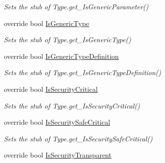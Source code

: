 \begin{DoxyCompactItemize}
\begin{DoxyCompactList}\small\item\em Sets the stub of Type.\-get\-\_\-\-Is\-Generic\-Parameter()\end{DoxyCompactList}\item 
override bool \hyperlink{class_system_1_1_reflection_1_1_fakes_1_1_stub_type_delegator_a31d4c9f0da2b370cdfa68913ef698212}{Is\-Generic\-Type}
\begin{DoxyCompactList}\small\item\em Sets the stub of Type.\-get\-\_\-\-Is\-Generic\-Type()\end{DoxyCompactList}\item 
override bool \hyperlink{class_system_1_1_reflection_1_1_fakes_1_1_stub_type_delegator_aca6de3d55dc36c0b1098b066b6d6821d}{Is\-Generic\-Type\-Definition}
\begin{DoxyCompactList}\small\item\em Sets the stub of Type.\-get\-\_\-\-Is\-Generic\-Type\-Definition()\end{DoxyCompactList}\item 
override bool \hyperlink{class_system_1_1_reflection_1_1_fakes_1_1_stub_type_delegator_a9d9290591ea518f5fbdc9dc2b28b3c0c}{Is\-Security\-Critical}
\begin{DoxyCompactList}\small\item\em Sets the stub of Type.\-get\-\_\-\-Is\-Security\-Critical()\end{DoxyCompactList}\item 
override bool \hyperlink{class_system_1_1_reflection_1_1_fakes_1_1_stub_type_delegator_a60bc89e4355a9c1f6e40ba72424f67f4}{Is\-Security\-Safe\-Critical}
\begin{DoxyCompactList}\small\item\em Sets the stub of Type.\-get\-\_\-\-Is\-Security\-Safe\-Critical()\end{DoxyCompactList}\item 
override bool \hyperlink{class_system_1_1_reflection_1_1_fakes_1_1_stub_type_delegator_af0463eda4e4325494044833460df4358}{Is\-Security\-Transparent}

\end{DoxyCompactItemize}
